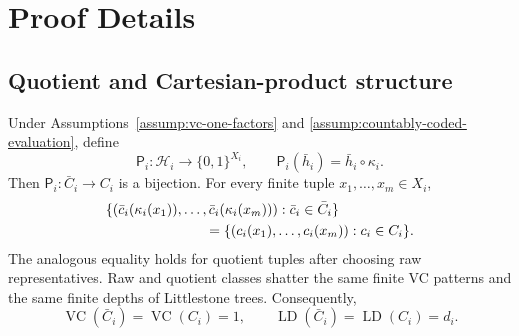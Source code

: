 \appendix

\section{Proof Details}\label{sec:proof-details}

\subsection{Quotient and Cartesian-product structure}\label{app:step-001}

\begin{lemma}\label{lem:step-001-quotient-invariance}
Under Assumptions~\ref{assump:vc-one-factors} and
\ref{assump:countably-coded-evaluation}, define
\[
\mathsf P_i:\mathcal H_i\longrightarrow\{0,1\}^{X_i},
\qquad \mathsf P_i(\bar h_i)=\bar h_i\circ\kappa_i.
\]
Then \(\mathsf P_i:\bar C_i\to C_i\) is a bijection.  For every
finite tuple \(x_1,\ldots,x_m\in X_i\),
\begin{equation}\label{eq:step-001-patterns}
\begin{split}
&\{(\bar c_i(\kappa_i(x_1)),\ldots,
        \bar c_i(\kappa_i(x_m))):\bar c_i\in\bar C_i\}\\
&\hspace{25mm}=
\{(c_i(x_1),\ldots,c_i(x_m)):c_i\in C_i\}.
\end{split}
\end{equation}
The analogous equality holds for quotient tuples after choosing raw
representatives.  Raw and quotient classes shatter the same finite VC
patterns and the same finite depths of Littlestone trees.  Consequently,
\[
\operatorname{VC}(\bar C_i)=\operatorname{VC}(C_i)=1,
\qquad
\operatorname{LD}(\bar C_i)=\operatorname{LD}(C_i)=d_i.
\]
\end{lemma}


